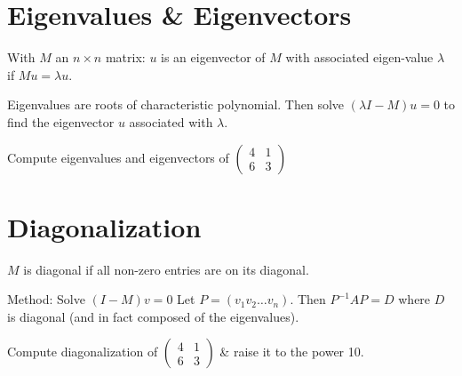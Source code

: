 \section{Eigenvalues \& Eigenvectors}
\begin{definition}
	With $M$ an $n \times n$ matrix:
	$u$ is an eigenvector of $M$ with associated eigen-value $\lambda$ if $Mu=\lambda u$.
\end{definition}

Eigenvalues are roots of characteristic polynomial.
Then solve $(\lambda I-M)u=0$ to find the eigenvector $u$ associated with $\lambda$.

\begin{example}
	Compute eigenvalues and eigenvectors of $\begin{pmatrix} 4&1\\ 6&3 \end{pmatrix}$
\end{example}

\section{Diagonalization}
\begin{definition}
	$M$ is diagonal if all non-zero entries are on its diagonal.
\end{definition}

Method: Solve $(I-M)v=0$
Let $P=(v_1 v_2 \dots v_n)$.
Then $P^{-1}AP = D$ where $D$ is diagonal (and in fact composed of the eigenvalues).

\begin{example}
	Compute diagonalization of $\begin{pmatrix} 4&1\\ 6&3 \end{pmatrix}$ \& raise it to the power 10.
\end{example}

